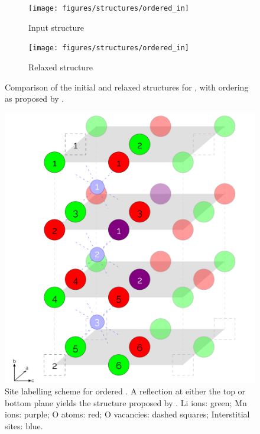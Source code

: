 \begin{figure}[p]
\centering

\begin{subfigure}{0.5\textwidth}
\centering
\texttt{[image: figures/structures/ordered\_in]}
\caption{Input structure\cite{Diaz-Lopez2017}}
\end{subfigure}%
\begin{subfigure}{0.5\textwidth}
\centering
\texttt{[image: figures/structures/ordered\_in]}
\caption{Relaxed structure}
\end{subfigure}

\caption[Comparison of the initial and relaxed structures for ordered ]{Comparison of the initial and relaxed structures for , with ordering as proposed by \citet{Diaz-Lopez2017}.}
\end{figure}

\newpage
\begin{figure}[h] %
\centering
\includegraphics[height = 0.55\textheight]{figures/orderedlabels/orderedlabels}
\caption[Site labelling scheme for ordered ]{Site labelling scheme for ordered . A reflection at either the top or bottom plane yields the structure proposed by \citet{Diaz-Lopez2017}. Li ions: green; Mn ions: purple; O atoms: red; O vacancies: dashed squares; Interstitial sites: blue.
}
\label{fig:orderedlabel}
\end{figure}

